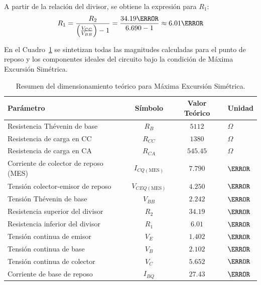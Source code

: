A partir de la relación del divisor, se obtiene la expresión para $R_1$:
\begin{equation}
  R_1 = \frac{R_2}{\left(\frac{V_{CC}}{V_{BB}}\right) - 1} = \frac{34.19\kohm}{6.690 - 1} \approx 6.01\kohm
  \label{eq:R1_teorica}
\end{equation}

En el Cuadro~\ref{tab:resumen_diseno_teorico} se sintetizan todas las magnitudes calculadas para el punto de reposo y los
componentes ideales del circuito bajo la condición de Máxima Excursión Simétrica.

\begin{table}[!ht]
  \centering
  \begin{tabular}{|l|c|c|l|}
    \hline
    \textbf{Parámetro} & \textbf{Símbolo} & \textbf{Valor Teórico} & \textbf{Unidad} \\
    \hline
    Resistencia Thévenin de base & $R_B$ & $5112$ & $\Omega$ \\
    Resistencia de carga en CC & $R_{CC}$ & $1380$ & $\Omega$ \\
    Resistencia de carga en CA & $R_{CA}$ & $545.45$ & $\Omega$ \\
    Corriente de colector de reposo (MES) & $I_{CQ(\text{MES})}$ & $7.790$ & $\mA$ \\
    Tensión colector-emisor de reposo & $V_{CEQ(\text{MES})}$ & $4.250$ & $\V$ \\
    Tensión Thévenin de base & $V_{BB}$ & $2.242$ & $\V$ \\
    Resistencia superior del divisor & $R_2$ & $34.19$ & $\kohm$ \\
    Resistencia inferior del divisor & $R_1$ & $6.01$ & $\kohm$ \\
    Tensión continua de emisor & $V_E$ & $1.402$ & $\V$ \\
    Tensión continua de base & $V_B$ & $2.102$ & $\V$ \\
    Tensión continua de colector & $V_C$ & $5.652$ & $\V$ \\
    Corriente de base de reposo & $I_{BQ}$ & $27.43$ & $\uA$ \\
    \hline
  \end{tabular}
  \caption{Resumen del dimensionamiento teórico para Máxima Excursión Simétrica.}
  \label{tab:resumen_diseno_teorico}
\end{table}
